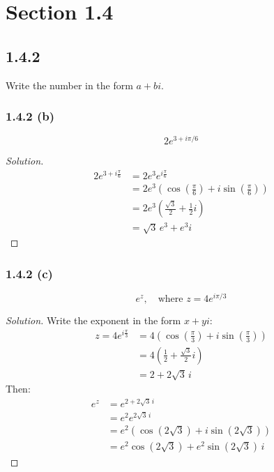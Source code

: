 \documentclass{article}
\newenvironment{solution}{
\begin{proof}[Solution]}{
\end{proof}}
\begin{document}
\section*{Section 1.4}

\subsection*{1.4.2}
Write the number in the form $a + bi$.

\subsubsection*{1.4.2 (b)}
\[
  2e^{3+i\pi/6}
\]
\begin{solution}
  \begin{align*}
    2e^{3 + i\frac{\pi}{6}}
    &= 2e^3 e^{i\frac{\pi}{6}}
    \\ &= 2e^3\left(\cos\left(\tfrac{\pi}{6}\right) + i\sin\left(\tfrac{\pi}{6}\right)\right)
    \\ &= 2e^3\left(\frac{\sqrt{3}}{2} + \frac{1}{2}i\right)
    \\ &= \sqrt{3}\,e^3 + e^3 i
  \end{align*}
\end{solution}

\subsubsection*{1.4.2 (c)}
\[
  e^z, \quad \text{where } z = 4e^{i\pi/3}
\]
\begin{solution}
  Write the exponent in the form $x + yi$:
  \begin{align*}
    z = 4e^{i\frac{\pi}{3}}
    &= 4\left(\cos\left(\tfrac{\pi}{3}\right) + i\sin\left(\tfrac{\pi}{3}\right)\right)
    \\ &= 4\left(\frac{1}{2} + \frac{\sqrt{3}}{2}i\right)
    \\ &= 2 + 2\sqrt{3}\,i
  \end{align*}
  Then:
  \begin{align*}
    e^z &= e^{2 + 2\sqrt{3}\,i}
    \\ &= e^2 e^{2\sqrt{3}\,i}
    \\ &= e^2\left(\cos(2\sqrt{3}) + i\sin(2\sqrt{3})\right)
    \\ &= e^2\cos(2\sqrt{3}) + e^2\sin(2\sqrt{3})\, i
  \end{align*}
\end{solution}
\end{document}
